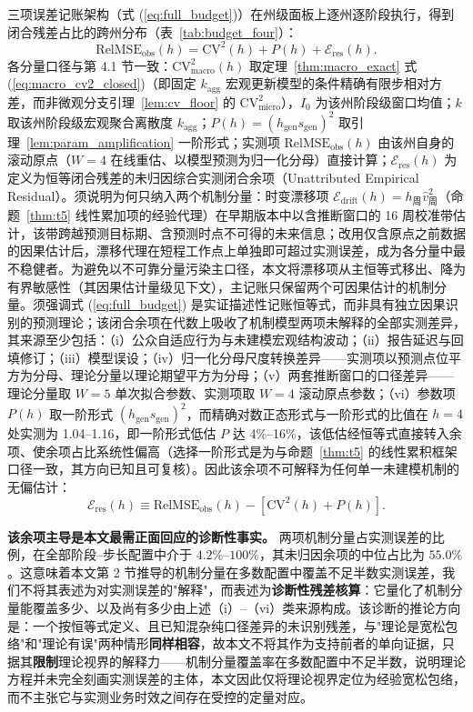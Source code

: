 \documentclass[11pt,a4paper]{article}
\theoremstyle{plain}
\theoremstyle{definition}
\begin{document}
三项误差记账架构（式 (\ref{eq:full_budget})）在州级面板上逐州逐阶段执行，得到闭合残差占比的跨州分布（表~\ref{tab:budget_four}）：
\begin{equation}
\text{RelMSE}_{\text{obs}}(h) = \text{CV}^2(h) + P(h) + \mathcal{E}_{\text{res}}(h).
\label{eq:full_budget}
\end{equation}
各分量口径与第 4.1 节一致：$\text{CV}^2_{\text{macro}}(h)$ 取定理~\ref{thm:macro_exact} 式 (\ref{eq:macro_cv2_closed})（即固定 $k_{\text{agg}}$ 宏观更新模型的条件精确有限步相对方差，而非微观分支引理~\ref{lem:cv_floor} 的 $\text{CV}^2_{\text{micro}}$），$I_0$ 为该州阶段级窗口均值；$k$ 取该州阶段级宏观聚合离散度 $k_{\text{agg}}$；$P(h) = (h_{\text{gen}} s_{\text{gen}})^2$ 取引理~\ref{lem:param_amplification} 一阶形式；实测项 $\text{RelMSE}_{\text{obs}}(h)$ 由该州自身的滚动原点（$W=4$ 在线重估、以模型预测为归一化分母）直接计算；$\mathcal{E}_{\text{res}}(h)$ 为定义为恒等闭合残差的未归因综合实测闭合余项（Unattributed Empirical Residual）。须说明为何只纳入两个机制分量：时变漂移项 $\mathcal{E}_{\text{drift}}(h) = h_{\text{周}}\widehat{v}^2_{\text{周}}$（命题~\ref{thm:t5} 线性累加项的经验代理）在早期版本中以含推断窗口的 16 周校准带估计，该带跨越预测目标期、含预测时点不可得的未来信息；改用仅含原点之前数据的因果估计后，漂移代理在短程工作点上单独即可超过实测误差，成为各分量中最不稳健者。为避免以不可靠分量污染主口径，本文将漂移项从主恒等式移出、降为有界敏感性（其因果估计量级见下文），主记账只保留两个可因果估计的机制分量。须强调式 (\ref{eq:full_budget}) 是实证描述性记账恒等式，而非具有独立因果识别的预测理论；该闭合余项在代数上吸收了机制模型两项未解释的全部实测差异，其来源至少包括：（i）公众自适应行为与未建模宏观结构波动；（ii）报告延迟与回填修订；（iii）模型误设；（iv）归一化分母尺度转换差异——实测项以预测点位平方为分母、理论分量以理论期望平方为分母；（v）两套推断窗口的口径差异——理论分量取 $W=5$ 单次拟合参数、实测项取 $W=4$ 滚动原点参数；（vi）参数项 $P(h)$ 取一阶形式 $(h_{\text{gen}}s_{\text{gen}})^2$，而精确对数正态形式与一阶形式的比值在 $h=4$ 处实测为 1.04--1.16，即一阶形式低估 $P$ 达 4\%--16\%，该低估经恒等式直接转入余项、使余项占比系统性偏高（选择一阶形式是为与命题~\ref{thm:t5} 的线性累积框架口径一致，其方向已知且可复核）。因此该余项不可解释为任何单一未建模机制的无偏估计：
\begin{equation}
\mathcal{E}_{\text{res}}(h) \equiv \text{RelMSE}_{\text{obs}}(h) - \left[ \text{CV}^2(h) + P(h) \right].
\end{equation}

\textbf{该余项主导是本文最需正面回应的诊断性事实。} 两项机制分量占实测误差的比例，在全部阶段--步长配置中介于 $4.2\%$--$100\%$，其未归因余项的中位占比为 $55.0\%$。这意味着本文第 2 节推导的机制分量在多数配置中覆盖不足半数实测误差，我们不将其表述为对实测误差的"解释"，而表述为\textbf{诊断性残差核算}：它量化了机制分量能覆盖多少、以及尚有多少由上述（i）--（vi）类来源构成。该诊断的推论方向是：一个按恒等式定义、且已知混杂纯口径差异的未识别残差，与"理论是宽松包络"和"理论有误"两种情形\textbf{同样相容}，故本文不将其作为支持前者的单向证据，只据其\textbf{限制}理论视界的解释力——机制分量覆盖率在多数配置中不足半数，说明理论方程并未完全刻画实测误差的主体，本文因此仅将理论视界定位为经验宽松包络，而不主张它与实测业务时效之间存在受控的定量对应。
\end{document}
